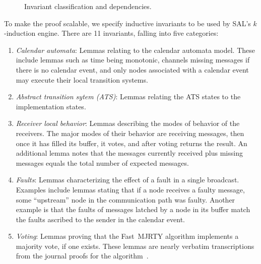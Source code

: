 \documentclass{llncs/llncs}
\begin{document}
{\begin{figure}
  \caption{Invariant classification and dependencies.}
  \label{fig:proof}
\end{figure}

To make the proof scalable, we specify inductive invariants to be used by SAL's $k$-induction engine. There are 11 invariants, falling into five categories:
\begin{enumerate}
  \item \emph{Calendar automata}: Lemmas relating to the calendar automata model. These include lemmas such as time being monotonic, channels missing messages if there is no calendar event, and only nodes associated with a calendar event may execute their local transition systems.
  \item \emph{Abstract transition sytem (ATS)}: Lemmas relating the ATS states to the implementation states.
  \item \emph{Receiver local behavior}: Lemmas describing the modes of behavior of the receivers. The major modes of their behavior are receiving messages, then once it has filled its buffer, it votes, and after voting returns the result. An additional lemma notes that the messages currently received plus missing messages equals the total number of expected messages.
  \item \emph{Faults}: Lemmas characterizing the effect of a fault in a single broadcast. Examples include lemmas stating that if a node receives a faulty message, some ``upstream'' node in the communication path was faulty. Another example is that the faults of messages latched by a node in its buffer match the faults ascribed to the sender in the calendar event.
  \item \emph{Voting}: Lemmas proving that the Fast~MJRTY algorithm implements a majority vote, if one exists. These lemmas are nearly verbatim transcriptions from the journal proofs for the algorithm~\cite{mjrty}.
\end{enumerate}
\noindent
}
\end{document}
